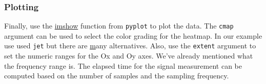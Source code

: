 \subsubsection{Plotting}

Finally, use the
\href{https://matplotlib.org/stable/api/_as_gen/matplotlib.pyplot.imshow.html}{
imshow} function from \texttt{pyplot} to plot the data. The \texttt{cmap}
argument can be used to select the color grading for the heatmap. In our example
use used \texttt{jet} but there are
\href{https://matplotlib.org/stable/users/explain/colors/colormaps.html} many
alternatives. Also, use the \texttt{extent} argument to set the numeric ranges
for the Ox and Oy axes. We've already mentioned what the frequency range is.
The elapsed time for the signal measurement can be computed based on the number
of samples and the sampling frequency.

